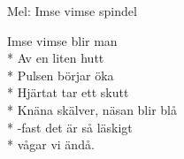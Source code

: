 \begin{SongText}
    \begin{SongInfo}
        Mel: Imse vimse spindel
    \end{SongInfo}
    \begin{SongVerse}
        Imse vimse blir man\\*%
        Av en liten hutt\\*%
        Pulsen börjar öka\\*%
        Hjärtat tar ett skutt\\*%
        Knäna skälver, näsan blir blå\\*%
        -fast det är så läskigt\\*%
        vågar vi ändå.
    \end{SongVerse}
\end{SongText}

